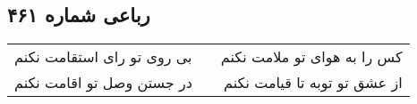 \begin{center}
\section*{رباعی شماره ۴۶۱}
\label{sec:sh461}
\begin{longtable}{l p{0.5cm} r}
بی روی تو رای استقامت نکنم
&&
کس را به هوای تو ملامت نکنم
\\
در جستن وصل تو اقامت نکنم
&&
از عشق تو توبه تا قیامت نکنم
\\
\end{longtable}
\end{center}
